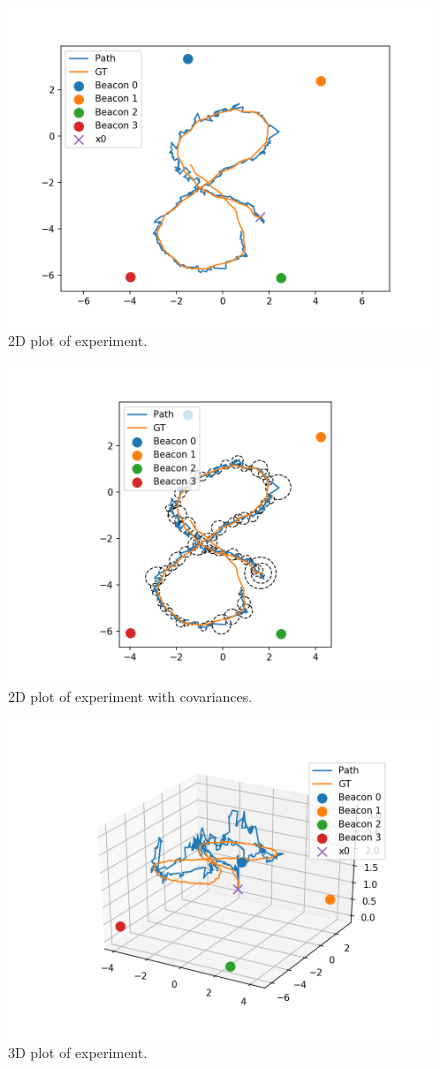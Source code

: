 \begin{figure}[H]
    \centering
    \includegraphics[width=\linewidth]{figures/2d_path.png}
    \caption{2D plot of experiment.}
    \label{fig:exp_2d_path}
\end{figure}
\begin{figure}[H]
    \centering
    \includegraphics[width=\linewidth]{figures/2d_with_cov.png}
    \caption{2D plot of experiment with covariances.}
    \label{fig:exp_2d_path_covariances}
\end{figure}
\begin{figure}[H]
    \centering
    \includegraphics[width=\linewidth]{figures/3d_path.png}
    \caption{3D plot of experiment.}
    \label{fig:exp_3D_path}
\end{figure}